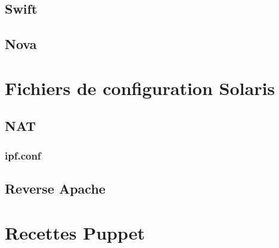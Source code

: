 \documentclass[a4paper,oneside]{report}
\begin{document}
\section{Swift}

\section{Nova}

\chapter{Fichiers de configuration Solaris}
\section{NAT}
\subsection{ipf.conf} \label{conf:NAT}
\section{Reverse Apache} \label{conf:apacheProxy}

\chapter{Recettes Puppet}

\nocite{*}
\printbibliography
\end{document}
